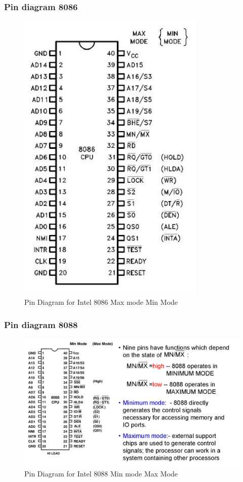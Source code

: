 \subsubsection{Pin diagram 8086}
\begin{figure}[h!]
    \centering
    \includegraphics[width = 0.8\textwidth]{./figures/8086_MaxMode.jpg}
    \caption{Pin Diagram for Intel 8086 Max mode {Min Mode}}
    \label{fig:bl}
\end{figure}

\subsubsection{Pin diagram 8088}
\begin{figure}[h!]
    \centering
    \includegraphics[width = 1.3\textwidth]{./figures/8088_MinMode.png}
    \caption{Pin Diagram for Intel 8088 Min mode {Max Mode}}
    \label{fig:bl}
\end{figure}

